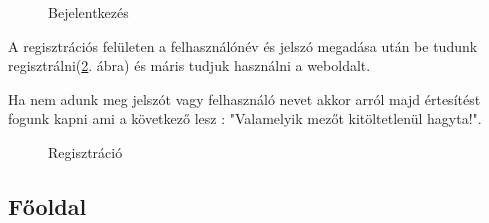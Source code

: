 \begin{figure}[h]
\centering
{}
\caption{Bejelentkezés}
\label{fig:Bejelentkezés}
\end{figure}

A regisztrációs felületen a felhasználónév és jelszó megadása után be tudunk regisztrálni(\ref{fig:Regisztráció}. ábra) és máris tudjuk használni a weboldalt.

Ha nem adunk meg jelszót vagy felhasználó nevet akkor arról majd értesítést fogunk kapni ami a következő lesz : "Valamelyik mezőt kitöltetlenül hagyta!".

\begin{figure}[h]
\centering
{}
\caption{Regisztráció}
\label{fig:Regisztráció}
\end{figure}

\newpage
\subsection{Főoldal}

